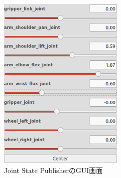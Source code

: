 \begin{figure}[htp]
  \centering
  \includegraphics[width=6cm]{pictures/chapter11/pic_11_43.png}
  \caption{Joint State PublisherのGUI画面}
\end{figure}

